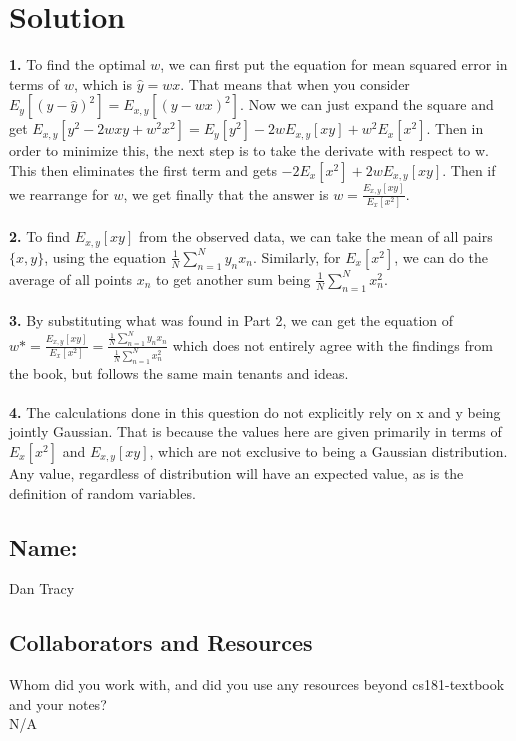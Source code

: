 \documentclass[submit]{harvardml}
\newenvironment{solution}
  {\color{blue}\section*{Solution}}
{}
\begin{document}
\newpage
\begin{solution}
  \textbf{1.} To find the optimal $w$, we can first put the equation
  for mean squared error in terms of $w$, which is $\hat{y} = wx$. That means
  that when you consider $E_{y}[(y-\hat{y})^2] = E_{x,y}[(y-wx)^2]$. Now we can just expand the square 
  and get $E_{x,y}[y^2-2wxy+w^2x^2] = E_y[y^2] - 2wE_{x,y}[xy] + w^2 E_{x}[x^2]$. Then in order to minimize this, the next step is to take the derivate 
  with respect to w. This then eliminates the first term and gets $-2E_{x}[x^2] + 2wE_{x,y}[xy]$. Then if we rearrange for $w$, we get finally that 
  the answer is $w = \frac{E_{x,y}[xy]}{E_{x}[x^2]}$. \\\\

  \textbf{2.} To find $E_{x,y}[xy]$ from the observed data, we can take the mean of all pairs $\{x,y\}$, using the equation $\frac{1}{N}\sum_{n=1}^{N}y_nx_n$. 
  Similarly, for $E_{x}[x^2]$, we can do the average of all points $x_n$ to get another sum being $\frac{1}{N}\sum_{n=1}^{N}x_n^2$. \\\\

  \textbf{3.} By substituting what was found in Part 2, we can get the equation of $w* = \frac{E_{x,y}[xy]}{E_{x}[x^2]} = \frac{\frac{1}{N}\sum_{n=1}^{N}y_nx_n}{\frac{1}{N}\sum_{n=1}^{N}x_n^2}$
  which does not entirely agree with the findings from the book, but follows the same main tenants and ideas. \\\\

  \textbf{4.} The calculations done in this question do not explicitly rely on x and y being jointly Gaussian. That is because the values here 
  are given primarily in terms of $E_x[x^2]$ and $E_{x,y}[xy]$, which are not exclusive to being a Gaussian distribution. Any value, regardless of distribution 
  will have an expected value, as is the definition of random variables. 
\end{solution}

\newpage
\subsection*{Name:} Dan Tracy

\subsection*{Collaborators and Resources}
Whom did you work with, and did you use any resources beyond cs181-textbook and your notes? \\
N/A
\end{document}
